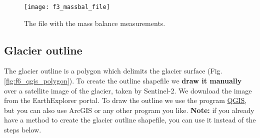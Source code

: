 \documentclass[15pt]{extarticle}
\begin{document}
\begin{figure}[h]
    \centering
    \texttt{[image: f3\_massbal\_file]}
    \caption{The file with the mass balance measurements.}
    \label{fig:f3_massbal_file}
\end{figure}



\subsection{Glacier outline}
\label{sect:input_outline}
The glacier outline is a polygon which delimits the glacier surface (Fig. \ref{fig:f6_qgis_polygon}). To create the outline shapefile we \textbf{draw it manually} over a satellite image of the glacier, taken by Sentinel-2. We download the image from the EarthExplorer portal. To draw the outline we use the program \href{https://qgis.org}{QGIS}, but you can also use ArcGIS or any other program you like. \textbf{Note:} if you already have a method to create the glacier outline shapefile, you can use it instead of the steps below.
\end{document}
